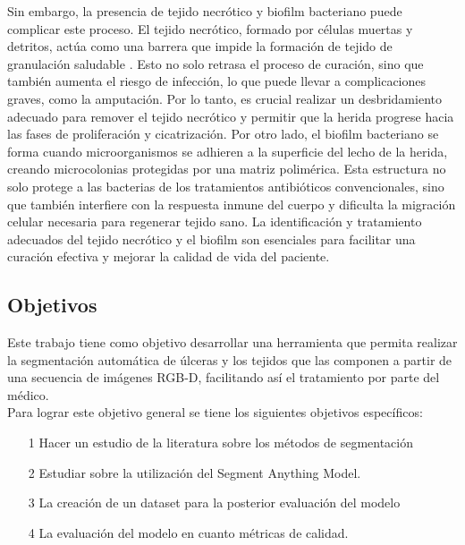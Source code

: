 \documentclass[12pt]{article}
\begin{document}
	Sin embargo, la presencia de tejido necrótico y biofilm bacteriano puede complicar este proceso. El tejido necrótico, formado por células muertas y detritos, actúa como una barrera que impide la formación de tejido de granulación saludable \parencite{Ulceras2024}. Esto no solo retrasa el proceso de curación, sino que también aumenta el riesgo de infección, lo que puede llevar a complicaciones graves, como la amputación. Por lo tanto, es crucial realizar un desbridamiento adecuado para remover el tejido necrótico y permitir que la herida progrese hacia las fases de proliferación y cicatrización.
	Por otro lado, el biofilm bacteriano se forma cuando microorganismos se adhieren a la superficie del lecho de la herida, creando microcolonias protegidas por una matriz polimérica. Esta estructura no solo protege a las bacterias de los tratamientos antibióticos convencionales, sino que también interfiere con la respuesta inmune del cuerpo y dificulta la migración celular necesaria para regenerar tejido sano. La identificación y tratamiento adecuados del tejido necrótico y el biofilm son esenciales para facilitar una curación efectiva y mejorar la calidad de vida del paciente.
	
	\subsection{Objetivos}
	Este trabajo tiene como objetivo desarrollar una herramienta que permita realizar la segmentación automática de úlceras y los tejidos que las componen a partir de una secuencia de imágenes RGB-D, facilitando así el tratamiento por parte del médico.	
	\\
	
	
	Para lograr este objetivo general se tiene los siguientes objetivos espec\'ificos:
	
	\begin{itemize}
		\item[1] Hacer un estudio de la literatura sobre los m\'etodos de segmentaci\'on
		\item[2] Estudiar sobre la utilizaci\'on del Segment Anything Model.
		\item[3] La creaci\'on de un dataset para la posterior evaluaci\'on del modelo
		\item[4] La evaluaci\'on del modelo en cuanto m\'etricas de calidad. 
	\end{itemize}
	
\end{document}

